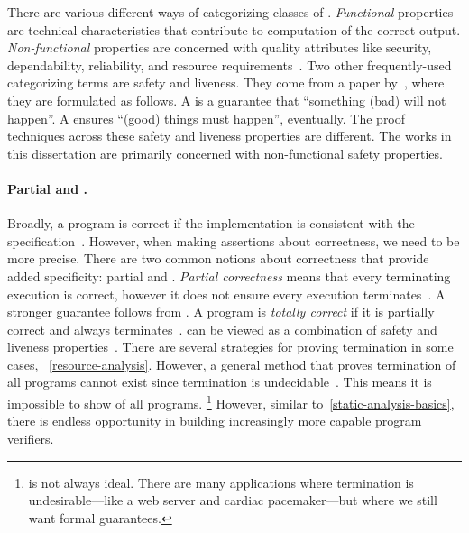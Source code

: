 There are various different ways of categorizing classes of .
\emph{Functional} properties are technical characteristics that contribute to computation of the correct output.
\emph{Non-functional} properties are concerned with quality attributes like security, dependability, reliability, and resource requirements~\cite{terbeek2018}.
Two other frequently-used categorizing terms are safety and liveness.
They come from a paper by~\textcite{lamport1977}, where they are formulated as follows.
A \emph{} is a guarantee that \enquote{something (bad) will not happen}.
A \emph{} ensures \enquote{(good) things must happen}, eventually.
The proof techniques across these safety and liveness properties are different.
The works in this dissertation are primarily concerned with non-functional safety properties.

\paragraph*{Partial and .}
Broadly, a program is correct if the implementation is consistent with the specification~\cite{furia2014b}.
However, when making assertions about correctness, we need to be more precise.
There are two common notions about correctness that provide added specificity: partial and .
\emph{Partial correctness} means that every terminating execution is correct, however it does not ensure every execution terminates~\cite[p. 64]{leino2023}.
A stronger guarantee follows from .
A program is \emph{totally correct} if it is partially correct and always terminates~\cite[p. 64]{leino2023}.
 can be viewed as a combination of safety and liveness properties~\cite{lamport1977}.
There are several strategies for proving termination in some cases, \cf~\autoref{resource-analysis}.
However, a general method that proves termination of all programs cannot exist since termination is undecidable~\cite{turing1936}.
This means it is impossible to show  of all programs.%
\footnote{ is not always ideal.
There are many applications where termination is undesirable---like a web server and cardiac pacemaker---but where we still want formal guarantees.}
However, similar to~\autoref{static-analysis-basics}, there is endless opportunity in building increasingly more capable program verifiers.

